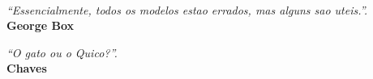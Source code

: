 \
\vfill

\begin{flushright}
\hfill \textit{``Essencialmente, todos os modelos estao errados, mas alguns sao uteis.''.} \\
{\bf George Box}
\end{flushright}

\begin{flushright}
\hfill \textit{``O gato ou o Quico?''.} \\
{\bf Chaves}
\end{flushright}

\vspace*{1cm}

